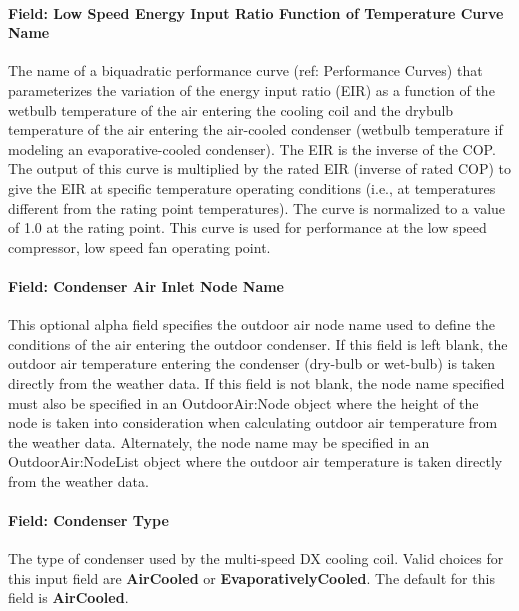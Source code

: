 \paragraph{Field: Low Speed Energy Input Ratio Function of Temperature Curve Name}\label{field-low-speed-energy-input-ratio-function-of-temperature-curve-name}

The name of a biquadratic performance curve (ref: Performance Curves) that parameterizes the variation of the energy input ratio (EIR) as a function of the wetbulb temperature of the air entering the cooling coil and the drybulb temperature of the air entering the air-cooled condenser (wetbulb temperature if modeling an evaporative-cooled condenser). The EIR is the inverse of the COP. The output of this curve is multiplied by the rated EIR (inverse of rated COP) to give the EIR at specific temperature operating conditions (i.e., at temperatures different from the rating point temperatures). The curve is normalized to a value of 1.0 at the rating point. This curve is used for performance at the low speed compressor, low speed fan operating point.

\paragraph{Field: Condenser Air Inlet Node Name}\label{field-condenser-air-inlet-node-name-1}

This optional alpha field specifies the outdoor air node name used to define the conditions of the air entering the outdoor condenser. If this field is left blank, the outdoor air temperature entering the condenser (dry-bulb or wet-bulb) is taken directly from the weather data. If this field is not blank, the node name specified must also be specified in an OutdoorAir:Node object where the height of the node is taken into consideration when calculating outdoor air temperature from the weather data. Alternately, the node name may be specified in an OutdoorAir:NodeList object where the outdoor air temperature is taken directly from the weather data.

\paragraph{Field: Condenser Type}\label{field-condenser-type-1}

The type of condenser used by the multi-speed DX cooling coil. Valid choices for this input field are \textbf{AirCooled} or \textbf{EvaporativelyCooled}. The default for this field is \textbf{AirCooled}.

